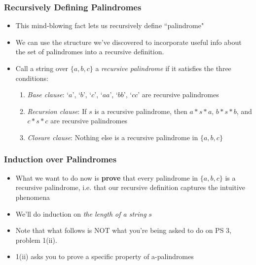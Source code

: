  \begin{frame}
\frametitle{Recursively Defining Palindromes}

\begin{itemize}[<+->]
\item This mind-blowing fact lets us recursively define ``palindrome"

\item We can use the structure we've discovered to incorporate useful info about the set of palindromes into a recursive definition. 

\item Call a string over $\{a,b,c\}$ a \emph{recursive palindrome} if it satisfies the three conditions:

\begin{enumerate}
\item {\emph{Base clause}}: `$a$', `$b$', `$c$', `$aa$', `$bb$', `$cc$'  are recursive palindromes

\item {\emph{Recursion clause}}: If $s$ is a recursive palindrome, then $a*s*a$, \phantom{vvvvvvvvvvvvvv} $b*s*b$, and $c*s*c$ are recursive palindromes

\item {\emph{Closure clause}}: Nothing else is a recursive palindrome in $\{a,b,c\}$
\end{enumerate}

\end{itemize} 
\end{frame}



\begin{frame}
\frametitle{Induction over Palindromes}

\begin{itemize}[<+->]
\item What we want to do now is {\bf{prove}} that every palindrome in $\{a,b,c\}$ is a recursive palindrome, i.e. that our recursive definition captures the intuitive phenomena 

\item We'll do induction on \textit{the length of a string} $s$

\item Note that what follows is NOT what you're being asked to do on PS 3, problem 1(ii). 

\item 1(ii) asks you to prove a specific property of a-palindromes 

\end{itemize} 
\end{frame}


